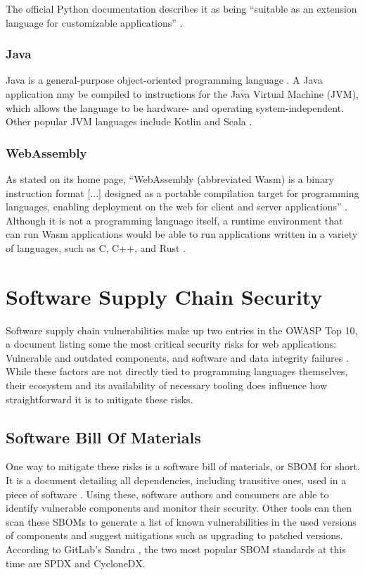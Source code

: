 The official Python documentation describes it as being ``suitable as an extension language for customizable applications'' \autocite{PSF2023}.

\subsubsection{Java}
Java is a general-purpose object-oriented programming language \autocite{Lindholm2015}. A Java application may be compiled to instructions for the Java Virtual Machine (JVM), which allows the language to be hardware- and operating system-independent. Other popular JVM languages include Kotlin and Scala \autocite{StackOverflow2023, JetBrains2023}.

\subsubsection{WebAssembly}
As stated on its home page, ``WebAssembly (abbreviated Wasm) is a binary instruction format [...] designed as a portable compilation target for programming languages, enabling deployment on the web for client and server applications'' \autocite{WebAssembly}. Although it is not a programming language itself, a runtime environment that can run Wasm applications would be able to run applications written in a variety of languages, such as C, C++, and Rust \autocite{EmscriptenContributors2015, RWWG2023}.

\section{Software Supply Chain Security}
Software supply chain vulnerabilities make up two entries in the OWASP Top 10, a document listing some the most critical security risks for web applications: Vulnerable and outdated components, and software and data integrity failures \autocite{OWASPTop102021}. While these factors are not directly tied to programming languages themselves, their ecosystem and its availability of necessary tooling does influence how straightforward it is to mitigate these risks.

\subsection{Software Bill Of Materials}
One way to mitigate these risks is a software bill of materials, or SBOM for short. It is a document detailing all dependencies, including transitive ones, used in a piece of software \autocite{SBOM2024}. Using these, software authors and consumers are able to identify vulnerable components and monitor their security. Other tools can then scan these SBOMs to generate a list of known vulnerabilities in the used versions of components and suggest mitigations such as upgrading to patched versions. 
According to GitLab's Sandra \textcite{Gittlen2024}, the two most popular SBOM standards at this time are SPDX and CycloneDX.

